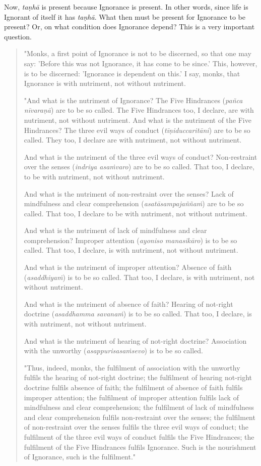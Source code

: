 Now, \emph{taṇhā} is present because Ignorance is present. In other words,
since life is Ignorant of itself it has \emph{taṇhā}. What then must be
present for Ignorance to be present? Or, on what condition does
Ignorance depend? This is a very important question.


\begin{quotation}
"Monks, a first point of Ignorance is not to be discerned, so that one
may say: 'Before this was not Ignorance, it has come to be since.' This,
however, is to be discerned: 'Ignorance is dependent on this.' I say,
monks, that Ignorance is with nutriment, not without nutriment.


"And what is the nutriment of Ignorance? The Five Hindrances (\emph{pañca
nīvaraṇā}) are to be so called. The Five Hindrances too, I declare, are
with nutriment, not without nutriment. And what is the nutriment of the
Five Hindrances? The three evil ways of conduct (\emph{tīṇiduccaritāni})
are to be so called. They too, I declare are with nutriment, not without
nutriment.


And what is the nutriment of the three evil ways of conduct?
Non-restraint over the senses (\emph{indriya asaṁvaro}) are to be so
called. That too, I declare, to be with nutriment, not without
nutriment.


And what is the nutriment of non-restraint over the senses? Lack of
mindfulness and clear comprehension (\emph{asatāsampajaññaṁ}) are to be so
called. That too, I declare to be with nutriment, not without nutriment.


And what is the nutriment of lack of mindfulness and clear
comprehension? Improper attention (\emph{ayoniso manasikāro}) is to be so
called. That too, I declare, is with nutriment, not without nutriment.


And what is the nutriment of improper attention? Absence of faith
(\emph{asaddhiyaṁ}) is to be so called. That too, I declare, is with
nutriment, not without nutriment.


And what is the nutriment of absence of faith? Hearing of not-right
doctrine (\emph{asaddhamma savanaṁ}) is to be so called. That too, I
declare, is with nutriment, not without nutriment.


And what is the nutriment of hearing of not-right doctrine? Association
with the unworthy (\emph{asappurisasaṁsevo}) is to be so called.


"Thus, indeed, monks, the fulfilment of association with the unworthy
fulfils the hearing of not-right doctrine; the fulfilment of hearing
not-right doctrine fulfils absence of faith; the fulfilment of absence
of faith fulfils improper attention; the fulfilment of improper
attention fulfils lack of mindfulness and clear comprehension; the
fulfilment of lack of mindfulness and clear comprehension fulfils
non-restraint over the senses; the fulfilment of non-restraint over the
senses fulfils the three evil ways of conduct; the fulfilment of the
three evil ways of conduct fulfils the Five Hindrances; the fulfilment
of the Five Hindrances fulfils Ignorance. Such is the nourishment of
Ignorance, such is the fulfilment."



\end{quotation}

